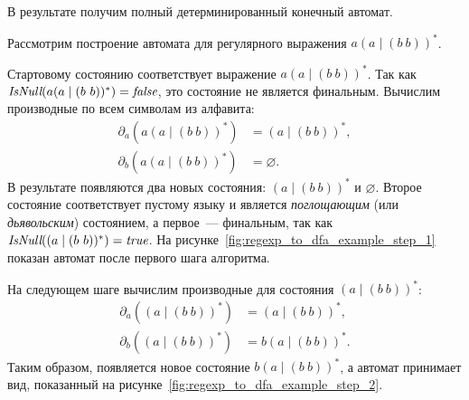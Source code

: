 В результате получим полный детерминированный конечный автомат.

\begin{example}
    Рассмотрим построение автомата для регулярного выражения $a(a \mid (b \ b))^*$.

    Стартовому состоянию соответствует выражение $a(a \mid (b \ b))^*$.
    Так как $\emph{IsNull}(a(a \mid (b \ b))^*) = \emph{false}$, это состояние не является финальным.
    Вычислим производные по всем символам из алфавита:
    \begin{align*}
        \partial_a(a(a \mid (b \ b))^*) & = (a \mid (b \ b))^*, \\
        \partial_b(a(a \mid (b \ b))^*) & = \varnothing.
    \end{align*}
    В результате появляются два новых состояния: $(a \mid (b \ b))^*$ и $\varnothing$.
    Второе состояние соответствует пустому языку и является \emph{поглощающим} (или \emph{дьявольским}) состоянием, а первое~--- финальным, так как $\emph{IsNull}((a \mid (b \ b))^*) = \emph{true}$.
    На рисунке~\ref{fig:regexp_to_dfa_example_step_1} показан автомат после первого шага алгоритма.

    \begin{marginfigure}
        \begin{center}
            \scalebox{0.64}{
            
            }
        \end{center}
        \caption{Построение автомата по регулярному выражению с помощью производных: первый шаг}
        \label{fig:regexp_to_dfa_example_step_1}
    \end{marginfigure}

    На следующем шаге вычислим производные для состояния $(a \mid (b \ b))^*$:
    \begin{align*}
        \partial_a((a \mid (b \ b))^*) & = (a \mid (b \ b))^*, \\
        \partial_b((a \mid (b \ b))^*) & = b(a \mid (b \ b))^*.
    \end{align*}
    Таким образом, появляется новое состояние $b(a \mid (b \ b))^*$, а автомат принимает вид, показанный на рисунке~\ref{fig:regexp_to_dfa_example_step_2}.

    \begin{marginfigure}
        \begin{center}
            \scalebox{0.64}{
            
            }
        \end{center}
        \caption{Построение автомата по регулярному выражению с помощью производных: второй шаг}
        \label{fig:regexp_to_dfa_example_step_2}
    \end{marginfigure}


\end{example}
